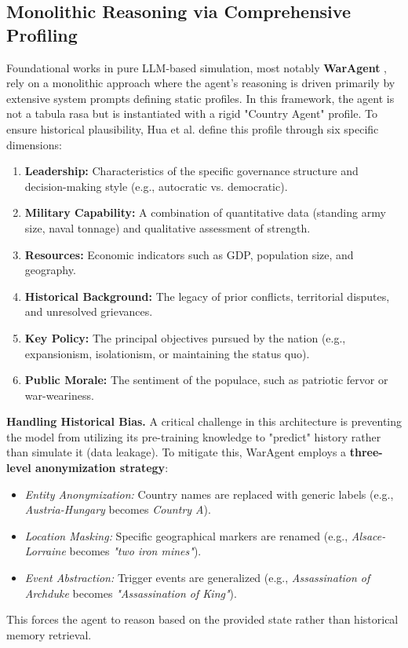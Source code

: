 \subsection{Monolithic Reasoning via Comprehensive Profiling}
Foundational works in pure LLM-based simulation, most notably \textbf{WarAgent} \cite{hua2023war}, rely on a monolithic approach where the agent's reasoning is driven primarily by extensive system prompts defining static profiles. In this framework, the agent is not a tabula rasa but is instantiated with a rigid "Country Agent" profile.
To ensure historical plausibility, Hua et al. define this profile through six specific dimensions:
\begin{enumerate}
    \item \textbf{Leadership:} Characteristics of the specific governance structure and decision-making style (e.g., autocratic vs. democratic).
    \item \textbf{Military Capability:} A combination of quantitative data (standing army size, naval tonnage) and qualitative assessment of strength.
    \item \textbf{Resources:} Economic indicators such as GDP, population size, and geography.
    \item \textbf{Historical Background:} The legacy of prior conflicts, territorial disputes, and unresolved grievances.
    \item \textbf{Key Policy:} The principal objectives pursued by the nation (e.g., expansionism, isolationism, or maintaining the status quo).
    \item \textbf{Public Morale:} The sentiment of the populace, such as patriotic fervor or war-weariness.
\end{enumerate}

\textbf{Handling Historical Bias.} A critical challenge in this architecture is preventing the model from utilizing its pre-training knowledge to "predict" history rather than simulate it (data leakage). To mitigate this, WarAgent employs a \textbf{three-level anonymization strategy}:
\begin{itemize}
    \item \textit{Entity Anonymization:} Country names are replaced with generic labels (e.g., \textit{Austria-Hungary} becomes \textit{Country A}).
    \item \textit{Location Masking:} Specific geographical markers are renamed (e.g., \textit{Alsace-Lorraine} becomes \textit{"two iron mines"}).
    \item \textit{Event Abstraction:} Trigger events are generalized (e.g., \textit{Assassination of Archduke} becomes \textit{"Assassination of King"}).
\end{itemize}
This forces the agent to reason based on the provided state rather than historical memory retrieval.

